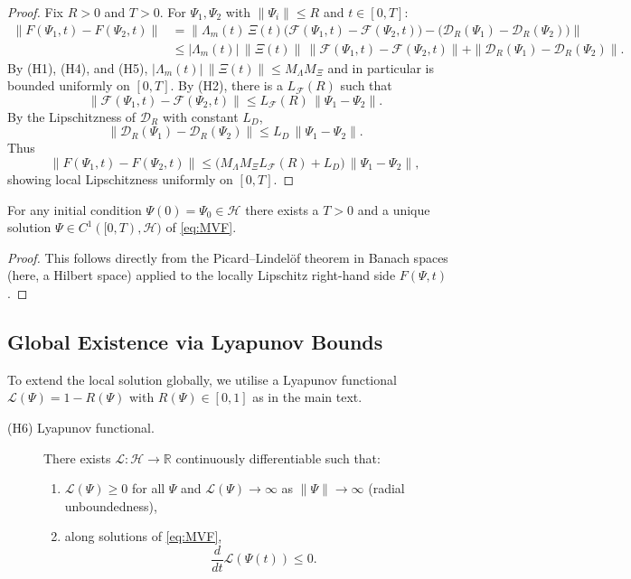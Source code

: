 \documentclass[11pt]{article}
\begin{document}
\begin{proof}
Fix $R>0$ and $T>0$. For $\Psi_1,\Psi_2$ with $\|\Psi_i\|\le R$ and $t\in [0,T]$:
\[
  \begin{aligned}
  \|F(\Psi_1,t) - F(\Psi_2,t)\|
  &= \bigl\|\Lambda_m(t)\,\Xi(t)\bigl(
       \mathcal{F}(\Psi_1,t)-\mathcal{F}(\Psi_2,t)
     \bigr) - \bigl(\mathcal{D}_R(\Psi_1)-\mathcal{D}_R(\Psi_2)\bigr)\bigr\| \\
  &\le
     |\Lambda_m(t)|\,\|\Xi(t)\|\, \|\mathcal{F}(\Psi_1,t)-\mathcal{F}(\Psi_2,t)\|
     + \|\mathcal{D}_R(\Psi_1)-\mathcal{D}_R(\Psi_2)\|.
  \end{aligned}
\]
By (H1), (H4), and (H5), $|\Lambda_m(t)|\,\|\Xi(t)\|\le M_\Lambda M_\Xi$ and in particular is bounded uniformly on $[0,T]$. By (H2), there is a $L_{\mathcal{F}}(R)$ such that
\[
  \|\mathcal{F}(\Psi_1,t)-\mathcal{F}(\Psi_2,t)\|\le L_{\mathcal{F}}(R)\,\|\Psi_1-\Psi_2\|.
\]
By the Lipschitzness of $\mathcal{D}_R$ with constant $L_D$,
\[
  \|\mathcal{D}_R(\Psi_1)-\mathcal{D}_R(\Psi_2)\|\le L_D\,\|\Psi_1-\Psi_2\|.
\]
Thus
\[
  \|F(\Psi_1,t)-F(\Psi_2,t)\|
  \le
  \bigl(M_\Lambda M_\Xi L_{\mathcal{F}}(R) + L_D\bigr)\,\|\Psi_1-\Psi_2\|,
\]
showing local Lipschitzness uniformly on $[0,T]$.
\end{proof}

\begin{proposition}
For any initial condition $\Psi(0)=\Psi_0\in\mathcal{H}$ there exists a $T>0$ and a unique solution $\Psi\in C^1([0,T),\mathcal{H})$ of \eqref{eq:MVF}.
\end{proposition}

\begin{proof}
This follows directly from the Picard--Lindelöf theorem in Banach spaces (here, a Hilbert space) applied to the locally Lipschitz right-hand side $F(\Psi,t)$.
\end{proof}

\subsection{Global Existence via Lyapunov Bounds}

To extend the local solution globally, we utilise a Lyapunov functional $\mathcal{L}(\Psi)=1-R(\Psi)$ with $R(\Psi)\in[0,1]$ as in the main text.

\begin{description}
  \item[(H6) Lyapunov functional.]
        There exists $\mathcal{L}:\mathcal{H}\to\mathbb{R}$ continuously differentiable such that:
        \begin{enumerate}
          \item $\mathcal{L}(\Psi)\ge 0$ for all $\Psi$ and $\mathcal{L}(\Psi)\to\infty$ as $\|\Psi\|\to\infty$ (radial unboundedness),
          \item along solutions of \eqref{eq:MVF},
                \[
                  \frac{d}{dt}\mathcal{L}(\Psi(t))\le 0.
                \]
        \end{enumerate}
\end{description}
\end{document}
